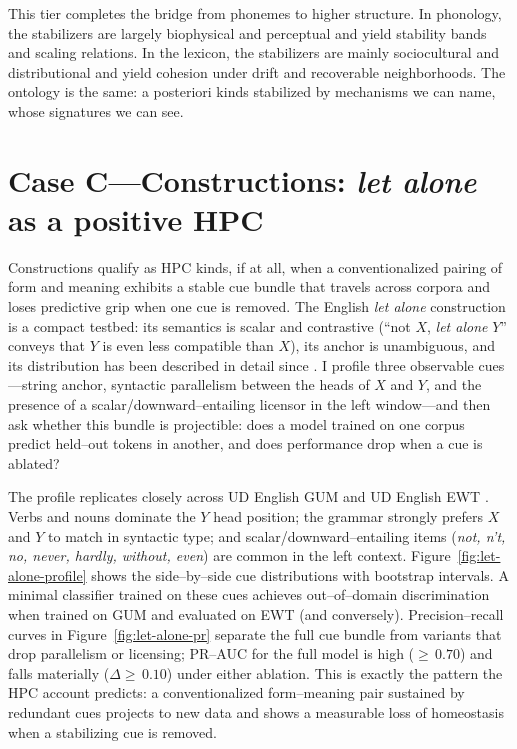 \documentclass[12pt]{article}
\begin{document}
This tier completes the bridge from phonemes to higher structure. In phonology, the stabilizers are largely biophysical and perceptual and yield stability bands and scaling relations. In the lexicon, the stabilizers are mainly sociocultural and distributional and yield cohesion under drift and recoverable neighborhoods. The ontology is the same: a posteriori kinds stabilized by mechanisms we can name, whose signatures we can see.

\section{Case C—Constructions: \emph{let alone} as a positive HPC}\label{sec:case-construction}

Constructions qualify as HPC kinds, if at all, when a conventionalized pairing of form and meaning exhibits a stable cue bundle that travels across corpora and loses predictive grip when one cue is removed. The English \emph{let alone} construction is a compact testbed: its semantics is scalar and contrastive (``not $X$, \emph{let alone} $Y$'' conveys that $Y$ is even less compatible than $X$), its anchor is unambiguous, and its distribution has been described in detail since \citet{FillmoreKayOConnor1988}. I profile three observable cues—string anchor, syntactic parallelism between the heads of $X$ and $Y$, and the presence of a scalar/downward–entailing licensor in the left window—and then ask whether this bundle is projectible: does a model trained on one corpus predict held–out tokens in another, and does performance drop when a cue is ablated?

The profile replicates closely across UD English GUM \citep{Zeldes2017GUM} and UD English EWT \citep{Silveira2014EWT}. Verbs and nouns dominate the $Y$ head position; the grammar strongly prefers $X$ and $Y$ to match in syntactic type; and scalar/downward–entailing items (\emph{not, n’t, no, never, hardly, without, even}) are common in the left context. Figure~\ref{fig:let-alone-profile} shows the side–by–side cue distributions with bootstrap intervals. A minimal classifier trained on these cues achieves out–of–domain discrimination when trained on GUM and evaluated on EWT (and conversely). Precision–recall curves in Figure~\ref{fig:let-alone-pr} separate the full cue bundle from variants that drop parallelism or licensing; PR–AUC for the full model is high ($\geq\,0.70$) and falls materially ($\Delta\geq\,0.10$) under either ablation. This is exactly the pattern the \textsc{HPC} account predicts: a conventionalized form–meaning pair sustained by redundant cues projects to new data and shows a measurable loss of homeostasis when a stabilizing cue is removed.
\end{document}
